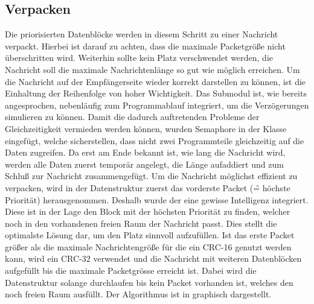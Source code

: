 \lstset{language=pseudo}
\lstset{commentstyle=\textit}


\subsection{Verpacken}

Die priorisierten Datenblöcke werden in diesem Schritt zu einer Nachricht
verpackt. Hierbei ist darauf zu achten, dass die maximale Packetgröße
nicht überschritten wird. Weiterhin sollte kein Platz verschwendet werden, \dahe
die Nachricht soll die maximale Nachrichtenlänge so gut wie möglich erreichen.
Um die Nachricht auf der Empfängerseite wieder korrekt darstellen zu können, ist
die Einhaltung der Reihenfolge von hoher Wichtigkeit. \newline
Das Submodul ist, wie bereits angesprochen, nebenläufig zum Programmablauf
integriert, um die Verzögerungen simulieren zu können. Damit die
dadurch auftretenden Probleme der Gleichzeitigkeit vermieden werden können,
wurden Semaphore in der Klasse 
eingefügt, welche sicherstellen, dass nicht zwei Programmteile gleichzeitig auf
die Daten zugreifen. Da erst am Ende bekannt ist, wie lang die Nachricht wird,
werden alle Daten zuerst temporär angelegt, die Länge aufaddiert und zum Schluß zur Nachricht
zusammengefügt.
Um die Nachricht möglichst effizient zu verpacken, wird in der
Datenstruktur  zuerst das vorderste Packet
(\^= höchste Priorität) herausgenommen. Deshalb wurde der
 eine gewisse Intelligenz integriert.
Diese ist in der Lage den Block mit der höchsten Priorität zu finden, welcher
noch in den vorhandenen freien Raum der Nachricht passt. Dies stellt die
optimalste Lösung dar, um den Platz sinnvoll aufzufüllen. \newline 
Ist das erste Packet größer als die maximale Nachrichtengröße für die ein CRC-16
genutzt werden kann, wird ein CRC-32 verwendet und die Nachricht mit weiteren
Datenblöcken aufgefüllt bis die maximale Packetgrösse erreicht ist. Dabei wird
die Datenstruktur  solange
durchlaufen bis kein Packet vorhanden ist, welches den noch freien Raum
ausfüllt. \newline 
Der Algorithmus ist in  graphisch dargestellt.

